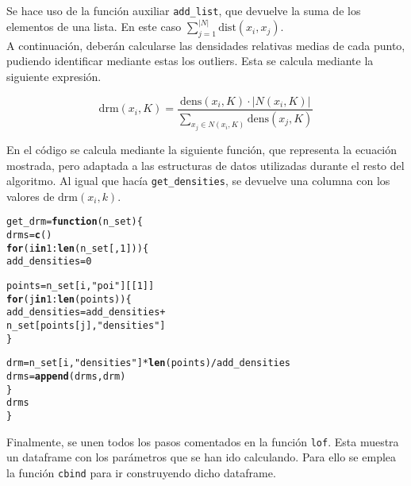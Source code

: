 \documentclass[12pt]{report}\usepackage[]{graphicx}\usepackage[dvipsnames]{xcolor}
\makeatletter
\newcommand{\hlnum}[1]{\textcolor[rgb]{0.686,0.059,0.569}{#1}}%
\newcommand{\hlstr}[1]{\textcolor[rgb]{0.192,0.494,0.8}{#1}}%
\newcommand{\hlopt}[1]{\textcolor[rgb]{0,0,0}{#1}}%
\newcommand{\hlstd}[1]{\textcolor[rgb]{0.345,0.345,0.345}{#1}}%
\newcommand{\hlkwa}[1]{\textcolor[rgb]{0.161,0.373,0.58}{\textbf{#1}}}%
\newcommand{\hlkwb}[1]{\textcolor[rgb]{0.69,0.353,0.396}{#1}}%
\newcommand{\hlkwc}[1]{\textcolor[rgb]{0.333,0.667,0.333}{#1}}%
\newcommand{\hlkwd}[1]{\textcolor[rgb]{0.737,0.353,0.396}{\textbf{#1}}}%
\newenvironment{kframe}{%
 \def\at@end@of@kframe{}%
 \ifinner\ifhmode%
  \def\at@end@of@kframe{\end{minipage}}%
  \begin{minipage}{\columnwidth}%
 \fi\fi%
 \def\FrameCommand##1{\hskip\@totalleftmargin \hskip-\fboxsep
 \colorbox{shadecolor}{##1}\hskip-\fboxsep
     \hskip-\linewidth \hskip-\@totalleftmargin \hskip\columnwidth}%
 \MakeFramed {\advance\hsize-\width
   \@totalleftmargin\z@ \linewidth\hsize
   \@setminipage}}%
 {\par\unskip\endMakeFramed%
 \at@end@of@kframe}
\newenvironment{knitrout}{}{} %
\newcommand{\dt}{\text{dist}}
\newcommand{\ds}{\text{dens}}
\newcommand{\drm}{\text{drm}}
\makeatother
\begin{document}
					Se hace uso de la función auxiliar \texttt{add\_list}, que devuelve la suma de los elementos de una lista. En este caso $\sum_{j=1}^{|N|} \dt(x_i, x_j)$. \\
					
					A continuación, deberán calcularse las densidades relativas medias de cada punto, pudiendo identificar mediante estas los outliers. Esta se calcula mediante la siguiente expresión. 
					
					$$
					\drm(x_i, K) = \frac{\ds(x_i, K) \cdot |N(x_i, K)|}{\displaystyle\sum_{x_j \in N(x_i, K)}\ds(x_j, K)}
					$$
					
					En el código se calcula mediante la siguiente función, que representa la ecuación mostrada, pero adaptada a las estructuras de datos utilizadas durante el resto del algoritmo. Al igual que hacía \texttt{get\_densities}, se devuelve una columna con los valores de $\drm(x_i, k)$. 
					
\begin{knitrout}
\color{fgcolor}\begin{kframe}
\begin{alltt}
\hlstd{get_drm} \hlkwb{=} \hlkwa{function}\hlstd{(}\hlkwc{n_set}\hlstd{) \{}
        \hlstd{drms} \hlkwb{=} \hlkwd{c}\hlstd{()}
        \hlkwa{for} \hlstd{(i} \hlkwa{in} \hlnum{1}\hlopt{:}\hlkwd{len}\hlstd{(n_set[,}\hlnum{1}\hlstd{])) \{}
                \hlstd{add_densities} \hlkwb{=} \hlnum{0}

                \hlstd{points} \hlkwb{=} \hlstd{n_set[i,} \hlstr{"poi"}\hlstd{][[}\hlnum{1}\hlstd{]]}
                \hlkwa{for} \hlstd{(j} \hlkwa{in} \hlnum{1}\hlopt{:}\hlkwd{len}\hlstd{(points)) \{}
                        \hlstd{add_densities} \hlkwb{=} \hlstd{add_densities} \hlopt{+}
                                \hlstd{n_set[points[j],} \hlstr{"densities"}\hlstd{]}
                \hlstd{\}}

                \hlstd{drm} \hlkwb{=} \hlstd{n_set[i,} \hlstr{"densities"}\hlstd{]} \hlopt{*} \hlkwd{len}\hlstd{(points)} \hlopt{/} \hlstd{add_densities}
                \hlstd{drms} \hlkwb{=} \hlkwd{append}\hlstd{(drms, drm)}
        \hlstd{\}}
        \hlstd{drms}
\hlstd{\}}
\end{alltt}
\end{kframe}
\end{knitrout}
					
					Finalmente, se unen todos los pasos comentados en la función \texttt{lof}. Esta muestra un dataframe con los parámetros que se han ido calculando. Para ello se emplea la función \texttt{cbind} para ir construyendo dicho dataframe. 
					
\end{document}
